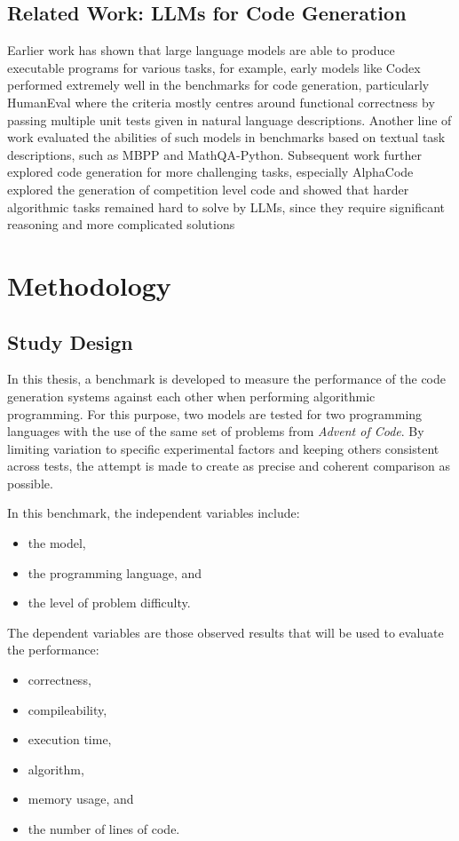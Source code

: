 \documentclass[12pt,a4paper]{report}
\begin{document}
\section{Related Work: LLMs for Code Generation}
Earlier work has shown that large language models are able to produce executable programs for various tasks, for example, early models like Codex performed extremely well in the benchmarks for code generation, particularly HumanEval where the criteria mostly centres around functional correctness by passing multiple unit tests given in natural language descriptions. Another line of work evaluated the abilities of such models in benchmarks based on textual task descriptions, such as MBPP and MathQA-Python. Subsequent work further explored code generation for more challenging tasks, especially AlphaCode explored the generation of competition level code and showed that harder algorithmic tasks remained hard to solve by LLMs, since they require significant reasoning and more complicated solutions



\chapter{Methodology}

\section{Study Design}
In this thesis, a benchmark is developed to measure the performance of the code generation systems against each other when performing algorithmic programming. For this purpose, two models are tested for two programming languages with the use of the same set of problems from \textit{Advent of Code}. By limiting variation to specific experimental factors and keeping others consistent across tests, the attempt is made to create as precise and coherent comparison as possible.

In this benchmark, the independent variables include:
\begin{itemize}
    \item the model,
    \item the programming language, and
    \item the level of problem difficulty.
\end{itemize}

The dependent variables are those observed results that will be used to evaluate the performance:
\begin{itemize}
    \item correctness,
    \item compileability,
    \item execution time,
    \item algorithm, 
    \item memory usage, and
    \item the number of lines of code.
\end{itemize}
\end{document}
